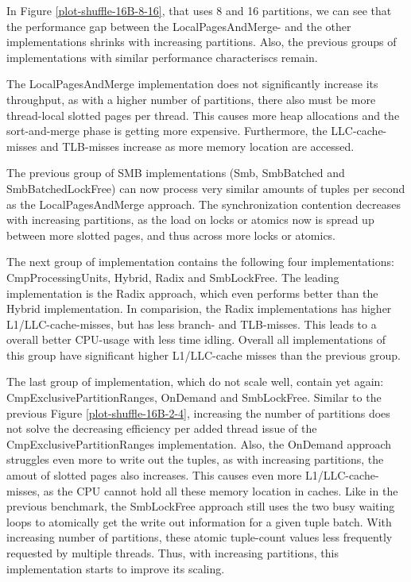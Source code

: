 In Figure \ref{plot-shuffle-16B-8-16}, that uses 8 and 16 partitions, we can see that the performance gap between the LocalPagesAndMerge- and the other implementations shrinks with increasing partitions.
Also, the previous groups of implementations with similar performance characteriscs remain.

The LocalPagesAndMerge implementation does not significantly increase its throughput, as with a higher number of partitions, there also must be more thread-local slotted pages per thread.
This causes more heap allocations and the sort-and-merge phase is getting more expensive.
Furthermore, the \ac{LLC}-cache-misses and \ac{TLB}-misses increase as more memory location are accessed.

The previous group of SMB implementations (Smb, SmbBatched and SmbBatchedLockFree) can now process very similar amounts of tuples per second as the LocalPagesAndMerge approach.
The synchronization contention decreases with increasing partitions, as the load on locks or atomics now is spread up between more slotted pages, and thus across more locks or atomics.

The next group of implementation contains the following four implementations: CmpProcessingUnits, Hybrid, Radix and SmbLockFree.
The leading implementation is the Radix approach, which even performs better than the Hybrid implementation.
In comparision, the Radix implementations has higher L1/LLC-cache-misses, but has less branch- and TLB-misses.
This leads to a overall better CPU-usage with less time idling.
Overall all implementations of this group have significant higher L1/LLC-cache misses than the previous group.

The last group of implementation, which do not scale well, contain yet again: CmpExclusivePartitionRanges, OnDemand and SmbLockFree.
Similar to the previous Figure \ref{plot-shuffle-16B-2-4}, increasing the number of partitions does not solve the decreasing efficiency per added thread issue of the CmpExclusivePartitionRanges implementation.
Also, the OnDemand approach struggles even more to write out the tuples, as with increasing partitions, the amout of slotted pages also increases.
This causes even more L1/LLC-cache-misses, as the \ac{CPU} cannot hold all these memory location in caches.
Like in the previous benchmark, the SmbLockFree approach still uses the two busy waiting loops to atomically get the write out information for a given tuple batch.
With increasing number of partitions, these atomic tuple-count values less frequently requested by multiple threads.
Thus, with increasing partitions, this implementation starts to improve its scaling.
